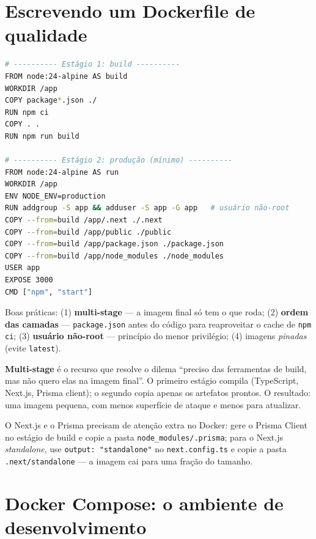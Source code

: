 \section{Escrevendo um Dockerfile de qualidade}

\begin{lstlisting}[style=livro, language=Bash,
  caption={Dockerfile multi-stage para uma app Next.js.}, label={list:docker-dockerfile}]
# ---------- Estágio 1: build ----------
FROM node:24-alpine AS build
WORKDIR /app
COPY package*.json ./
RUN npm ci
COPY . .
RUN npm run build

# ---------- Estágio 2: produção (mínimo) ----------
FROM node:24-alpine AS run
WORKDIR /app
ENV NODE_ENV=production
RUN addgroup -S app && adduser -S app -G app   # usuário não-root
COPY --from=build /app/.next ./.next
COPY --from=build /app/public ./public
COPY --from=build /app/package.json ./package.json
COPY --from=build /app/node_modules ./node_modules
USER app
EXPOSE 3000
CMD ["npm", "start"]
\end{lstlisting}

\begin{caixadica}
Boas práticas: (1) \textbf{multi-stage} — a imagem final só tem o que roda;
(2) \textbf{ordem das camadas} — \texttt{package.json} antes do código para
reaproveitar o cache de \texttt{npm ci}; (3) \textbf{usuário não-root} —
princípio do menor privilégio; (4) imagens \emph{pinadas} (evite \texttt{latest}).
\end{caixadica}

\begin{caixaconceito}
\textbf{Multi-stage} é o recurso que resolve o dilema ``preciso das
ferramentas de build, mas não quero elas na imagem final''. O primeiro estágio
compila (TypeScript, Next.js, Prisma client); o segundo copia apenas os
artefatos prontos. O resultado: uma imagem pequena, com menos superfície de
ataque e menos para atualizar.
\end{caixaconceito}

\begin{caixadica}
O Next.js e o Prisma precisam de atenção extra no Docker: gere o Prisma Client
no estágio de build e copie a pasta \texttt{node\_modules/.prisma}; para o
Next.js \emph{standalone}, use \texttt{output: "standalone"} no
\texttt{next.config.ts} e copie a pasta \texttt{.next/standalone} — a imagem
cai para uma fração do tamanho.
\end{caixadica}

\section{Docker Compose: o ambiente de desenvolvimento}

